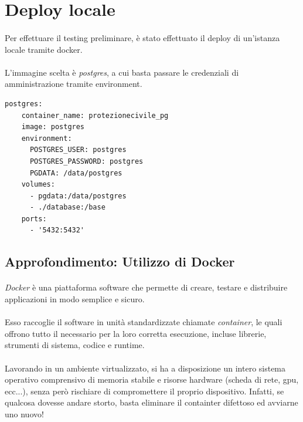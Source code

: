 \documentclass[12pt,a4paper,twoside,english,italian]{book}
\begin{document}
\section{Deploy locale}

\paragraph{} Per effettuare il testing preliminare, è stato effettuato il deploy di un'istanza locale tramite docker. 

\paragraph{} L'immagine scelta è \emph{postgres}, a cui basta passare le credenziali di amministrazione tramite environment. 

\begin{lstlisting}[caption=Configurazione di docker compose per postgres]
postgres:
    container_name: protezionecivile_pg
    image: postgres
    environment:
      POSTGRES_USER: postgres
      POSTGRES_PASSWORD: postgres
      PGDATA: /data/postgres
    volumes:
      - pgdata:/data/postgres
      - ./database:/base
    ports:
      - '5432:5432'
\end{lstlisting}


\subsection{Approfondimento: Utilizzo di Docker}

\paragraph{} \emph{Docker} \cite{docker} è una piattaforma software che permette di creare, testare e distribuire applicazioni in modo semplice e sicuro.

\paragraph{} Esso raccoglie il software in unità standardizzate chiamate \emph{container}, le quali offrono tutto il necessario per la loro corretta esecuzione, incluse librerie, strumenti di sistema, codice e runtime. 

\paragraph{} Lavorando in un ambiente virtualizzato, si ha a disposizione un intero sistema operativo comprensivo di memoria stabile e risorse hardware (scheda di rete, gpu, ecc...), senza però rischiare di compromettere il proprio dispositivo. Infatti, se qualcosa dovesse andare storto, basta eliminare il containter difettoso ed avviarne uno nuovo!
\end{document}
